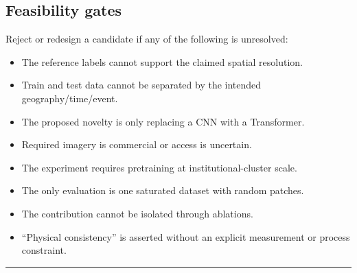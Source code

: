 \documentclass[
  a4paper,
  11pt]{article}
\providecommand{\tightlist}{%
  \setlength{\itemsep}{0pt}\setlength{\parskip}{0pt}}
\begin{document}
\hypertarget{feasibility-gates}{%
\subsection{Feasibility gates}\label{feasibility-gates}}

Reject or redesign a candidate if any of the following is unresolved:

\begin{itemize}
\tightlist
\item
  The reference labels cannot support the claimed spatial resolution.
\item
  Train and test data cannot be separated by the intended
  geography/time/event.
\item
  The proposed novelty is only replacing a CNN with a Transformer.
\item
  Required imagery is commercial or access is uncertain.
\item
  The experiment requires pretraining at institutional-cluster scale.
\item
  The only evaluation is one saturated dataset with random patches.
\item
  The contribution cannot be isolated through ablations.
\item
  ``Physical consistency'' is asserted without an explicit measurement
  or process constraint.
\end{itemize}

\begin{center}\rule{0.5\linewidth}{0.5pt}\end{center}
\end{document}
